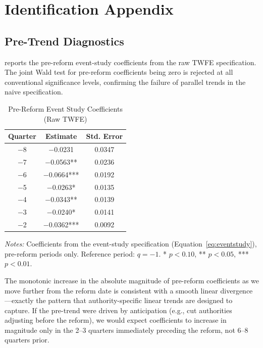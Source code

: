 \documentclass[12pt]{article}
\begin{document}
\section{Identification Appendix}
\label{app:identification}

\subsection{Pre-Trend Diagnostics}

 reports the pre-reform event-study coefficients from the raw TWFE specification. The joint Wald test for pre-reform coefficients being zero is rejected at all conventional significance levels, confirming the failure of parallel trends in the naive specification.

\begin{table}[H]
\centering
\caption{Pre-Reform Event Study Coefficients (Raw TWFE)}
\label{tab:pretrends}
\begin{threeparttable}
\begin{tabular}{ccc}
\toprule
Quarter & Estimate & Std. Error \\
\midrule
$-$8 & $-$0.0231 & 0.0347 \\
$-$7 & $-$0.0563** & 0.0236 \\
$-$6 & $-$0.0664*** & 0.0192 \\
$-$5 & $-$0.0263* & 0.0135 \\
$-$4 & $-$0.0343** & 0.0139 \\
$-$3 & $-$0.0240* & 0.0141 \\
$-$2 & $-$0.0362*** & 0.0092 \\
\bottomrule
\end{tabular}
\begin{tablenotes}[flushleft]
\small
\item \emph{Notes:} Coefficients from the event-study specification (Equation~\ref{eq:eventstudy}), pre-reform periods only. Reference period: $q = -1$. * $p<0.10$, ** $p<0.05$, *** $p<0.01$.
\end{tablenotes}
\end{threeparttable}
\end{table}

The monotonic increase in the absolute magnitude of pre-reform coefficients as we move further from the reform date is consistent with a smooth linear divergence---exactly the pattern that authority-specific linear trends are designed to capture. If the pre-trend were driven by anticipation (e.g., cut authorities adjusting before the reform), we would expect coefficients to increase in magnitude only in the 2--3 quarters immediately preceding the reform, not 6--8 quarters prior.
\end{document}
